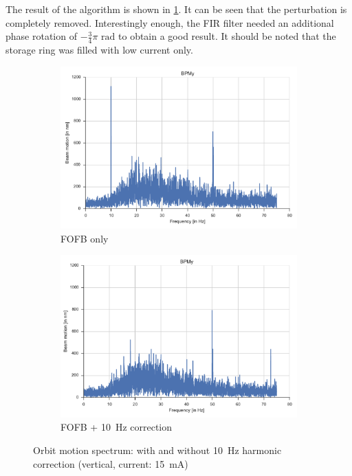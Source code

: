 The result of the algorithm is shown in \cref{fig:compare_dyn_corr}. It can be seen that the perturbation is completely removed. Interestingly enough, the FIR filter needed an additional phase rotation of $-\frac{3}{4}\pi \text{~rad}$ to obtain a good result. It should be noted that the storage ring was filled with low current only.

\begin{figure}
    \centering
    \begin{subfigure}[b]{0.8\textwidth}
        \includegraphics[width=\linewidth]{img/fft_fofb_low}
        \caption{FOFB only}
    \end{subfigure}
    \begin{subfigure}[b]{0.8\textwidth}
    \includegraphics[width=\linewidth]{img/fft_fofb_dyn_low}
    \caption{FOFB + \SI{10}{\hertz} correction}
    \end{subfigure}
    \caption{\label{fig:compare_dyn_corr}Orbit motion spectrum: with and without \SI{10}{\hertz} harmonic correction (vertical, current: \SI{15}{\milli\ampere})}
\end{figure}


